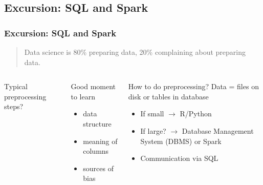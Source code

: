 \subsection{Excursion: SQL and Spark}

\begin{frame}
	\frametitle{Excursion: SQL and Spark}
	\begin{quotation}
		Data science is 80\% preparing data, 20\% complaining about preparing data.
	\end{quotation}
	
	\vfill
	
	\begin{columns}[onlytextwidth]
		\begin{block}{Typical preprocessing steps?}
		\end{block}
		
		\begin{block}{Good moment to learn}
			\begin{itemize}
				\item data structure
				\item meaning of columns
				\item sources of bias
			\end{itemize}
		\end{block}
		
		\begin{block}{How to do preprocessing?}
			Data = files on disk or tables in database
			\begin{itemize}
				\item If small $\rightarrow$ R/Python
				\item If large? $\rightarrow$ Database Management System (DBMS) or Spark
				\item Communication via SQL
			\end{itemize}
		\end{block}
	\end{columns}
\end{frame}

